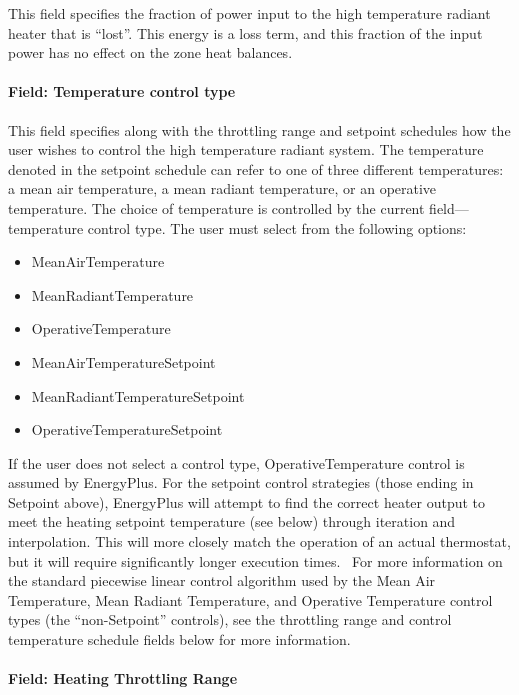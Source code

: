 This field specifies the fraction of power input to the high temperature radiant heater that is ``lost''. This energy is a loss term, and this fraction of the input power has no effect on the zone heat balances.

\paragraph{Field: Temperature control type}\label{field-temperature-control-type-3}

This field specifies along with the throttling range and setpoint schedules how the user wishes to control the high temperature radiant system. The temperature denoted in the setpoint schedule can refer to one of three different temperatures: a mean air temperature, a mean radiant temperature, or an operative temperature. The choice of temperature is controlled by the current field---temperature control type. The user must select from the following options:

\begin{itemize}
\item
  MeanAirTemperature
\item
  MeanRadiantTemperature
\item
  OperativeTemperature
\item
  MeanAirTemperatureSetpoint
\item
  MeanRadiantTemperatureSetpoint
\item
  OperativeTemperatureSetpoint
\end{itemize}

If the user does not select a control type, OperativeTemperature control is assumed by EnergyPlus. For the setpoint control strategies (those ending in Setpoint above), EnergyPlus will attempt to find the correct heater output to meet the heating setpoint temperature (see below) through iteration and interpolation. This will more closely match the operation of an actual thermostat, but it will require significantly longer execution times.~ For more information on the standard piecewise linear control algorithm used by the Mean Air Temperature, Mean Radiant Temperature, and Operative Temperature control types (the ``non-Setpoint'' controls), see the throttling range and control temperature schedule fields below for more information.

\paragraph{Field: Heating Throttling Range}\label{field-heating-throttling-range-1}

